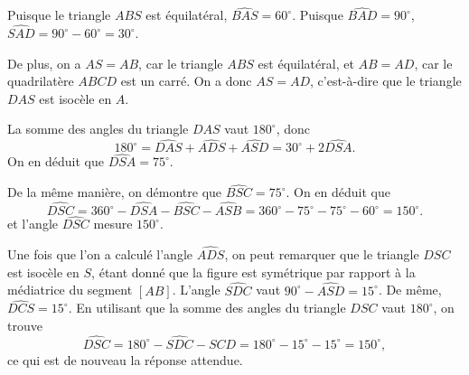 \begin{center}
\end{center}

Puisque le triangle $ABS$ est équilatéral, $\widehat{BAS}=60^\circ$. Puisque $\widehat{BAD}=90^\circ$, $\widehat{SAD}=90^\circ-60^\circ=30^\circ$. 

De plus, on a $AS=AB$, car le triangle $ABS$ est équilatéral, et $AB=AD$, car le quadrilatère $ABCD$ est un carré. On a donc $AS=AD$, c'est-à-dire que le triangle $DAS$ est isocèle en $A$.

La somme des angles du triangle $DAS$ vaut $180^\circ$, donc 
$$180^\circ=\widehat{DAS}+\widehat{ADS}+\widehat{ASD}=30^\circ+2\widehat{DSA}.$$
On en déduit que $\widehat{DSA}=75^\circ$.

De la même manière, on démontre que $\widehat{BSC}=75^\circ$. On en déduit que 
$$\widehat{DSC}=360^\circ-\widehat{DSA}-\widehat{BSC}-\widehat{ASB}=360^\circ-75^\circ-75^\circ-60^\circ=150^\circ.$$
et l'angle $\widehat{DSC}$ mesure $150^\circ$.

\altsol

Une fois que l'on a calculé l'angle $\widehat{ADS}$, on peut remarquer que le triangle $DSC$ est isocèle en $S$, étant donné que la figure est symétrique par rapport à la médiatrice du segment $[AB]$. L'angle $\widehat{SDC}$ vaut $90^\circ-\widehat{ASD}=15^\circ$. De même, $\widehat{DCS}=15^\circ$. En utilisant que la somme des angles du triangle $DSC$ vaut $180^\circ$, on trouve
$$\widehat{DSC}=180^\circ-\widehat{SDC}-\widehat{SCD}=180^\circ-15^\circ-15^\circ=150^\circ,$$
ce qui est de nouveau la réponse attendue.